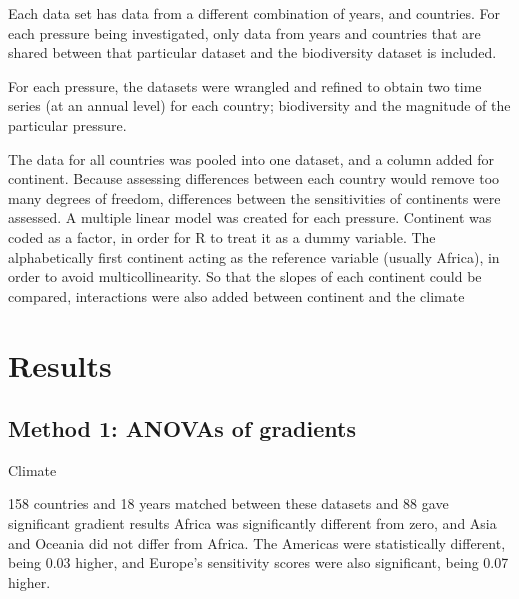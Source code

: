 \documentclass[11pt, a4paper, titlepage]{article}
\begin{document}
Each data set has data from a different combination of years, and countries. For each pressure being investigated, only data from years and countries that are shared between that particular dataset and the biodiversity dataset is included. \newline

For each pressure, the datasets were wrangled and refined to obtain two time series (at an annual level) for each country; biodiversity and the magnitude of the particular pressure. 

The data for all countries was pooled into one dataset, and a column added for continent. Because assessing differences between each country would remove too many degrees of freedom, differences between the sensitivities of continents were assessed. A multiple linear model was created for each pressure. Continent was coded as a factor, in order for R to treat it as a dummy variable. The alphabetically first continent acting as the reference variable (usually Africa), in order to avoid multicollinearity. So that the slopes of each continent could be compared, interactions were also added between continent and the climate \newline


	

	
	
	
		
	 
	
	
	

	\clearpage

	\section*{Results}
	 
	\subsection*{Method 1: ANOVAs of gradients}
	
	Climate \newline
	
	158 countries and 18 years matched between these datasets and 88 gave significant gradient results \newline
	Africa was significantly different from zero, and Asia and Oceania did not differ from Africa. The Americas were statistically different, being 0.03 higher, and Europe's sensitivity scores were also significant, being 0.07 higher. 
	
\end{document}
